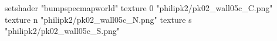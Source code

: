 setshader "bumpspecmapworld"
    texture 0 "philipk2/pk02_wall05c_C.png"
    texture n "philipk2/pk02_wall05c_N.png"
    texture s "philipk2/pk02_wall05c_S.png"